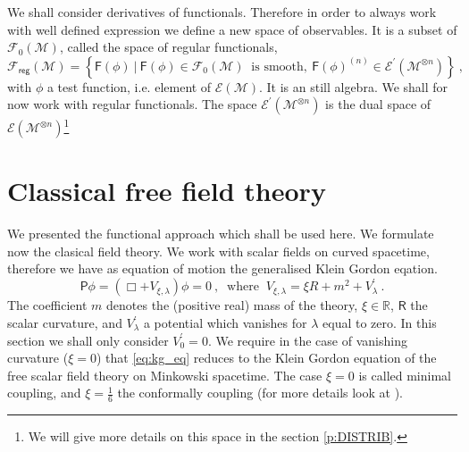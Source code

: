 \documentclass[12pt]{book}
\newcommand{\supp}{\mathsf{supp}}
\newcommand{\Ecal}{\mathcal{E}}
\newcommand{\Fcal}{\mathcal{F}}
\newcommand{\Mcal}{\mathcal{M}}
\newcommand{\Rbb}{\mathbb{R}}
\newcommand{\Fsf}{\mathsf{F}}
\newcommand{\Psf}{\mathsf{P}}
\newcommand{\Rsf}{\mathsf{R}}
\theoremstyle{break}
\begin{document}


%
%




We shall consider derivatives of functionals. Therefore in order to always work with well defined expression we define a new space of observables. It is a subset of $\Fcal_0(\Mcal)$, called the space of regular functionals,
%
\begin{equation*}
\Fcal_{\mathsf{reg}}(\Mcal) = \left\{ \Fsf(\phi) \ \bigg| \ \Fsf(\phi) \in \Fcal_0(\Mcal) \ \mbox{ is smooth}, \ \Fsf(\phi)^{(n)} \in \Ecal^\prime(\Mcal^{\otimes n}) \right\} \ ,
\end{equation*}
%
with $\phi$ a test function, i.e. element of $\Ecal(\Mcal)$. It is an still algebra. We shall for now work with regular functionals. The space $\Ecal^\prime(\Mcal^{\otimes n})$ is the dual space of $\Ecal(\Mcal^{\otimes n})$\footnote{We will give more details on this space in the section \ref{p:DISTRIB}.}


\section{Classical free field theory}\label{p:CLASSICAL}






We presented the functional approach which shall be used here. We formulate now the clasical field theory. We work with scalar fields on curved spacetime, therefore we have as equation of motion the generalised Klein Gordon eqation.%
%
\begin{equation*} 
\Psf \phi = \left( \Box + V_{\xi,\lambda} \right) \phi = 0 \ , \
\mbox{ where } \ V_{\xi,\lambda} = \xi R + m^2 + V^\prime_\lambda \ . 
\label{eq:kg_eq}
\end{equation*}
%
The coefficient $m$ denotes the (positive real) mass of the theory, $\xi \in \Rbb$, $\Rsf$ the scalar curvature, and $V^\prime_\lambda$ a potential which vanishes for $\lambda$ equal to zero. In this section we shall only consider $V^\prime_0=0$. We require in the case of vanishing curvature ($\xi=0$) that \eqref{eq:kg_eq} reduces to the Klein Gordon equation of the free scalar field theory on Minkowski spacetime. The case $\xi=0$ is called minimal coupling, and $\xi=\frac16$ the conformally coupling (for more details look at \cite{waldGR}).
\end{document}

